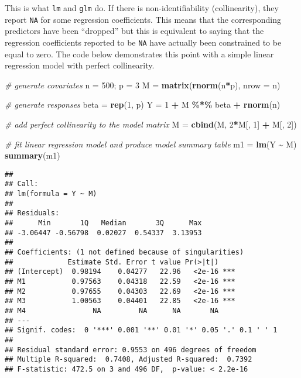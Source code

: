 \documentclass[
]{article}
\newenvironment{Shaded}{\begin{snugshade}}{\end{snugshade}}
\newcommand{\AttributeTok}[1]{\textcolor[rgb]{0.13,0.29,0.53}{#1}}
\newcommand{\CommentTok}[1]{\textcolor[rgb]{0.56,0.35,0.01}{\textit{#1}}}
\newcommand{\DecValTok}[1]{\textcolor[rgb]{0.00,0.00,0.81}{#1}}
\newcommand{\FunctionTok}[1]{\textcolor[rgb]{0.13,0.29,0.53}{\textbf{#1}}}
\newcommand{\NormalTok}[1]{#1}
\newcommand{\OtherTok}[1]{\textcolor[rgb]{0.56,0.35,0.01}{#1}}
\newcommand{\SpecialCharTok}[1]{\textcolor[rgb]{0.81,0.36,0.00}{\textbf{#1}}}
\begin{document}
This is what \texttt{lm} and \texttt{glm} do. If there is
non-identifiability (collinearity), they report \texttt{NA} for some
regression coefficients. This means that the corresponding predictors
have been ``dropped'' but this is equivalent to saying that the
regression coefficients reported to be \texttt{NA} have actually been
constrained to be equal to zero. The code below demonstrates this point
with a simple linear regression model with perfect collinearity.

\vspace{12pt}

\begin{Shaded}
\begin{Highlighting}[]
\CommentTok{\# generate covariates}
\NormalTok{n }\OtherTok{=} \DecValTok{500}\NormalTok{; p }\OtherTok{=} \DecValTok{3}
\NormalTok{M }\OtherTok{=} \FunctionTok{matrix}\NormalTok{(}\FunctionTok{rnorm}\NormalTok{(n}\SpecialCharTok{*}\NormalTok{p), }\AttributeTok{nrow =}\NormalTok{ n)}

\CommentTok{\# generate responses}
\NormalTok{beta }\OtherTok{=} \FunctionTok{rep}\NormalTok{(}\DecValTok{1}\NormalTok{, p)}
\NormalTok{Y }\OtherTok{=} \DecValTok{1} \SpecialCharTok{+}\NormalTok{ M }\SpecialCharTok{\%*\%}\NormalTok{ beta }\SpecialCharTok{+} \FunctionTok{rnorm}\NormalTok{(n)}

\CommentTok{\# add perfect collinearity to the model matrix}
\NormalTok{M }\OtherTok{=} \FunctionTok{cbind}\NormalTok{(M, }\DecValTok{2}\SpecialCharTok{*}\NormalTok{M[, }\DecValTok{1}\NormalTok{] }\SpecialCharTok{+}\NormalTok{ M[, }\DecValTok{2}\NormalTok{])}

\CommentTok{\# fit linear regression model and produce model summary table}
\NormalTok{m1 }\OtherTok{=} \FunctionTok{lm}\NormalTok{(Y }\SpecialCharTok{\textasciitilde{}}\NormalTok{ M)}
\FunctionTok{summary}\NormalTok{(m1)}
\end{Highlighting}
\end{Shaded}

\begin{verbatim}
## 
## Call:
## lm(formula = Y ~ M)
## 
## Residuals:
##      Min       1Q   Median       3Q      Max 
## -3.06447 -0.56798  0.02027  0.54337  3.13953 
## 
## Coefficients: (1 not defined because of singularities)
##             Estimate Std. Error t value Pr(>|t|)    
## (Intercept)  0.98194    0.04277   22.96   <2e-16 ***
## M1           0.97563    0.04318   22.59   <2e-16 ***
## M2           0.97655    0.04303   22.69   <2e-16 ***
## M3           1.00563    0.04401   22.85   <2e-16 ***
## M4                NA         NA      NA       NA    
## ---
## Signif. codes:  0 '***' 0.001 '**' 0.01 '*' 0.05 '.' 0.1 ' ' 1
## 
## Residual standard error: 0.9553 on 496 degrees of freedom
## Multiple R-squared:  0.7408, Adjusted R-squared:  0.7392 
## F-statistic: 472.5 on 3 and 496 DF,  p-value: < 2.2e-16
\end{verbatim}
\end{document}

